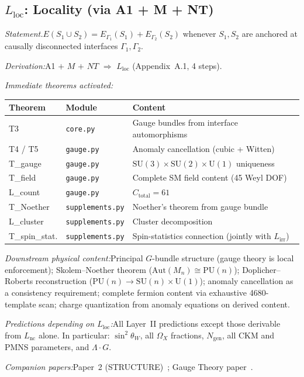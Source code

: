 \documentclass[11pt]{article}
\newcommand{\Ctot}{C_{\mathrm{total}}}
\newcommand{\sw}{\sin^2\!\theta_W}
\newcommand{\Ngen}{N_{\mathrm{gen}}}
\newcommand{\LG}{\Lambda \cdot G}
\newcommand{\Lnc}{L_{\mathrm{nc}}}
\newcommand{\Lloc}{L_{\mathrm{loc}}}
\newcommand{\Lirr}{L_{\mathrm{irr}}}
\newcommand{\Aut}{\mathrm{Aut}}
\newcommand{\SU}{\mathrm{SU}}
\newcommand{\U}{\mathrm{U}}
\begin{document}
\subsection{\texorpdfstring{$L_{\mathrm{loc}}$}{Lloc}: Locality (via A1 + M + NT)}

\begin{tcolorbox}[apfbox, title={$\Lloc$ $\longrightarrow$ Gauge Theory}]
\textit{Statement.}\quad $E(S_1 \cup S_2) = E_{\Gamma_1}(S_1) + E_{\Gamma_2}(S_2)$ whenever $S_1, S_2$ are anchored at causally disconnected interfaces $\Gamma_1, \Gamma_2$.

\textit{Derivation:}\quad A1 $+$ $M$ $+$ $NT$ $\Rightarrow$ $\Lloc$ (Appendix~A.1, 4 steps).

\smallskip\noindent\textit{Immediate theorems activated:}
\begin{center}
\small
\renewcommand{\arraystretch}{1.15}
\begin{tabular}{lll}
\toprule
\textbf{Theorem} & \textbf{Module} & \textbf{Content} \\
\midrule
T3 & \texttt{core.py} & Gauge bundles from interface automorphisms \\
T4 / T5 & \texttt{gauge.py} & Anomaly cancellation (cubic + Witten) \\
T\_gauge & \texttt{gauge.py} & $\SU(3)\!\times\!\SU(2)\!\times\!\U(1)$ uniqueness \\
T\_field & \texttt{gauge.py} & Complete SM field content (45 Weyl DOF) \\
L\_count & \texttt{gauge.py} & $\Ctot = 61$ \\
T\_Noether & \texttt{supplements.py} & Noether's theorem from gauge bundle \\
L\_cluster & \texttt{supplements.py} & Cluster decomposition \\
T\_spin\_stat. & \texttt{supplements.py} & Spin-statistics connection (jointly with $\Lirr$) \\
\bottomrule
\end{tabular}
\end{center}

\smallskip\noindent\textit{Downstream physical content:}\quad Principal $G$-bundle structure (gauge theory is local enforcement); Skolem--Noether theorem ($\Aut(M_n) \cong \mathrm{PU}(n)$); Doplicher--Roberts reconstruction ($\mathrm{PU}(n) \to \SU(n) \times \U(1)$); anomaly cancellation as a consistency requirement; complete fermion content via exhaustive 4680-template scan; charge quantization from anomaly equations on derived content.

\smallskip\noindent\textit{Predictions depending on $\Lloc$:}\quad All Layer~II predictions except those derivable from $\Lnc$ alone.  In particular: $\sw$, all $\Omega_X$ fractions, $\Ngen$, all CKM and PMNS parameters, and $\LG$.

\smallskip\noindent\textit{Companion papers:}\quad Paper~2 (STRUCTURE)~\cite{P2}; Gauge Theory paper~\cite{PGT}.
\end{tcolorbox}
\end{document}
